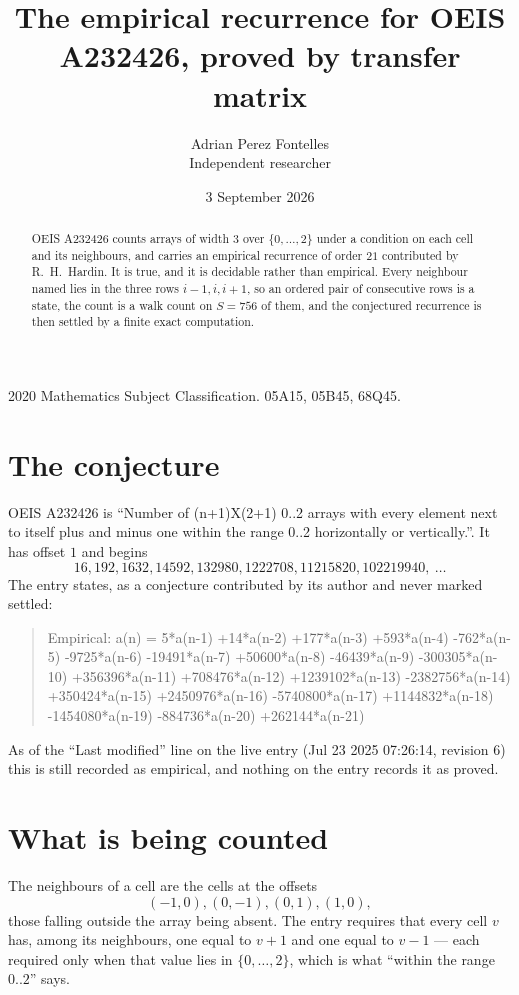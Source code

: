\documentclass[11pt,a4paper]{article}
\title{The empirical recurrence for OEIS A232426, proved by transfer matrix}
\author{Adrian Perez Fontelles\\ \small Independent researcher}
\date{3 September 2026}
\theoremstyle{plain}
\theoremstyle{definition}
\begin{document}
\maketitle

\begin{abstract}
OEIS A232426 counts arrays of width $3$ over $\{0,\dots,2\}$ under a condition on each cell
and its neighbours, and carries an empirical recurrence of order $21$ contributed by
R.~H.~Hardin. It is true, and it is decidable rather than empirical. Every neighbour named lies
in the three rows $i-1,i,i+1$, so an ordered pair of consecutive rows is a state, the count is
a walk count on $S=756$ of them, and the conjectured recurrence is then settled by a finite
exact computation.
\end{abstract}

\noindent\small 2020 Mathematics Subject Classification. 05A15, 05B45, 68Q45.\normalsize

\section{The conjecture}

OEIS A232426 is ``Number of (n+1)X(2+1) 0..2 arrays with every element next to itself plus and minus one within the range 0..2 horizontally or vertically.''. It has offset $1$ and begins
\[
16, 192, 1632, 14592, 132980, 1222708, 11215820, 102219940,\ \dots
\]
The entry states, as a conjecture contributed by its author and never marked settled:
\begin{quote}
Empirical: a(n) = 5*a(n-1) +14*a(n-2) +177*a(n-3) +593*a(n-4) -762*a(n-5) -9725*a(n-6) -19491*a(n-7) +50600*a(n-8) -46439*a(n-9) -300305*a(n-10) +356396*a(n-11) +708476*a(n-12) +1239102*a(n-13) -2382756*a(n-14) +350424*a(n-15) +2450976*a(n-16) -5740800*a(n-17) +1144832*a(n-18) -1454080*a(n-19) -884736*a(n-20) +262144*a(n-21)
\end{quote}
As of the ``Last modified'' line on the live entry (Jul 23 2025 07:26:14, revision 6) this is still
recorded as empirical, and nothing on the entry records it as proved.

\section{What is being counted}

The neighbours of a cell are the cells at the offsets
\[
(-1,0), (0,-1), (0,1), (1,0),
\]
those falling outside the array being absent. The entry requires that every cell $v$ has, among its neighbours, one equal to $v+1$ and one equal to $v-1$ --- each required only when that value lies in $\{0,\dots,2\}$, which is what ``within the range $0..2$'' says.
\end{document}
